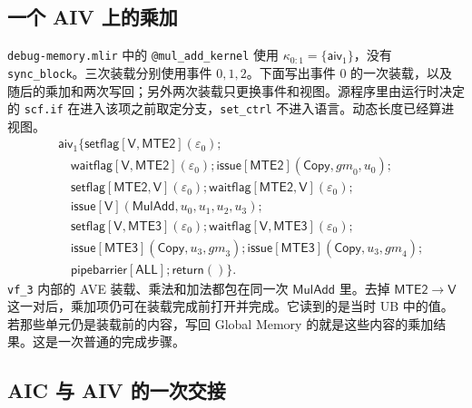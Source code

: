 \documentclass[UTF8,a4paper,11pt,fontset=fandol]{ctexart}
\newcommand{\kw}[1]{\ensuremath{\mathsf{#1}}}
\begin{document}
\subsection{一个 AIV 上的乘加}

\texttt{debug-memory.mlir} 中的 \texttt{@mul\_add\_kernel} 使用 $\kappa_{0:1}=\{\mathsf{aiv}_1\}$，没有 \texttt{sync\_block}。三次装载分别使用事件 $0,1,2$。下面写出事件 $0$ 的一次装载，以及随后的乘加和两次写回；另外两次装载只更换事件和视图。源程序里由运行时决定的 \texttt{scf.if} 在进入该项之前取定分支，\texttt{set\_ctrl} 不进入语言。动态长度已经算进视图。
\[
\begin{aligned}
&\mathsf{aiv}_1\{
  \kw{setflag}[\mathsf{V},\mathsf{MTE2}](\varepsilon_0);\\
&\quad\kw{waitflag}[\mathsf{V},\mathsf{MTE2}](\varepsilon_0);
  \kw{issue}[\mathsf{MTE2}](\kw{Copy},\mathit{gm}_0,u_0);\\
&\quad\kw{setflag}[\mathsf{MTE2},\mathsf{V}](\varepsilon_0);
  \kw{waitflag}[\mathsf{MTE2},\mathsf{V}](\varepsilon_0);\\
&\quad\kw{issue}[\mathsf{V}](\kw{MulAdd},u_0,u_1,u_2,u_3);\\
&\quad\kw{setflag}[\mathsf{V},\mathsf{MTE3}](\varepsilon_0);
  \kw{waitflag}[\mathsf{V},\mathsf{MTE3}](\varepsilon_0);\\
&\quad  \kw{issue}[\mathsf{MTE3}](\kw{Copy},u_3,\mathit{gm}_3);
  \kw{issue}[\mathsf{MTE3}](\kw{Copy},u_3,\mathit{gm}_4);\\
&\quad\kw{pipebarrier}[\mathsf{ALL}];
  \kw{return}()\}.
\end{aligned}
\]
\texttt{vf\_3} 内部的 AVE 装载、乘法和加法都包在同一次 $\kw{MulAdd}$ 里。去掉 $\mathsf{MTE2}\to\mathsf{V}$ 这一对后，乘加项仍可在装载完成前打开并完成。它读到的是当时 UB 中的值。若那些单元仍是装载前的内容，写回 Global Memory 的就是这些内容的乘加结果。这是一次普通的完成步骤。

\subsection{AIC 与 AIV 的一次交接}
\end{document}
